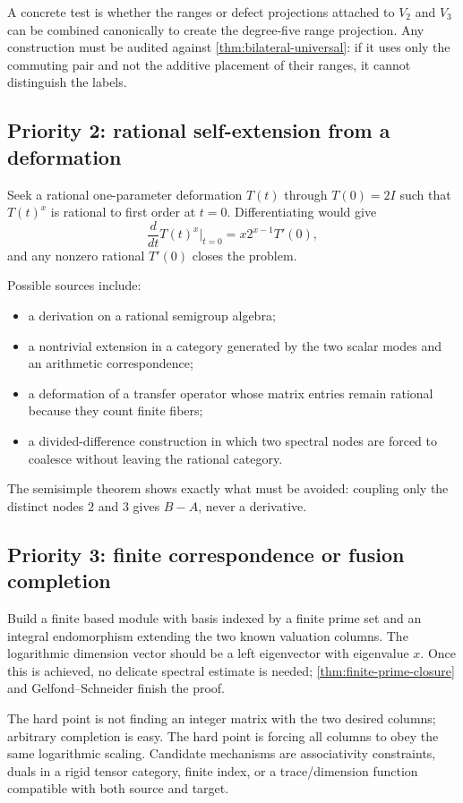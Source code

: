 \documentclass[11pt,oneside]{article}
\theoremstyle{definition}
\theoremstyle{remark}
\begin{document}
A concrete test is whether the ranges or defect projections attached to
\(V_2\) and \(V_3\) can be combined canonically to create the degree-five
range projection.  Any construction must be audited against
\cref{thm:bilateral-universal}: if it uses only the commuting pair and
not the additive placement of their ranges, it cannot distinguish the
labels.

\subsection{Priority 2: rational self-extension from a deformation}

Seek a rational one-parameter deformation \(T(t)\) through \(T(0)=2I\)
such that \(T(t)^x\) is rational to first order at \(t=0\).  Differentiating
would give
\[
        \frac{d}{dt}T(t)^x\bigg|_{t=0}
        =x2^{x-1}T'(0),
\]
and any nonzero rational \(T'(0)\) closes the problem.

Possible sources include:
\begin{itemize}
\item a derivation on a rational semigroup algebra;
\item a nontrivial extension in a category generated by the two scalar
      modes and an arithmetic correspondence;
\item a deformation of a transfer operator whose matrix entries remain
      rational because they count finite fibers;
\item a divided-difference construction in which two spectral nodes are
      forced to coalesce without leaving the rational category.
\end{itemize}
The semisimple theorem shows exactly what must be avoided: coupling only
the distinct nodes \(2\) and \(3\) gives \(B-A\), never a derivative.

\subsection{Priority 3: finite correspondence or fusion completion}

Build a finite based module with basis indexed by a finite prime set and
an integral endomorphism extending the two known valuation columns.
The logarithmic dimension vector should be a left eigenvector with
eigenvalue \(x\).  Once this is achieved, no delicate spectral estimate
is needed; \cref{thm:finite-prime-closure} and Gelfond--Schneider finish
the proof.

The hard point is not finding an integer matrix with the two desired
columns; arbitrary completion is easy.  The hard point is forcing all
columns to obey the same logarithmic scaling.  Candidate mechanisms are
associativity constraints, duals in a rigid tensor category, finite
index, or a trace/dimension function compatible with both source and
target.
\end{document}
